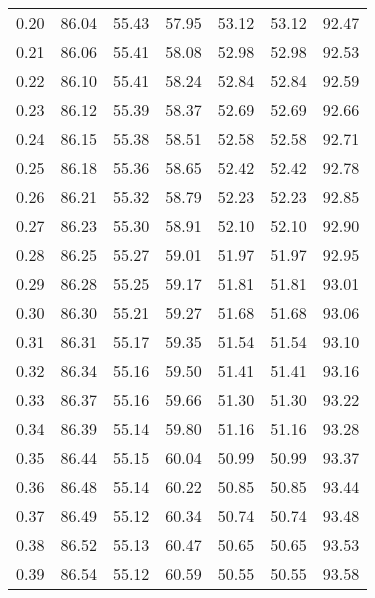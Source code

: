 \begin{tabular}{|c|c|c|c|c|c|c|}
      0.20 &     86.04 &     55.43 &      57.95 &   53.12 &      53.12 &         92.47 \\
      0.21 &     86.06 &     55.41 &      58.08 &   52.98 &      52.98 &         92.53 \\
      0.22 &     86.10 &     55.41 &      58.24 &   52.84 &      52.84 &         92.59 \\
      0.23 &     86.12 &     55.39 &      58.37 &   52.69 &      52.69 &         92.66 \\
      0.24 &     86.15 &     55.38 &      58.51 &   52.58 &      52.58 &         92.71 \\
      0.25 &     86.18 &     55.36 &      58.65 &   52.42 &      52.42 &         92.78 \\
      0.26 &     86.21 &     55.32 &      58.79 &   52.23 &      52.23 &         92.85 \\
      0.27 &     86.23 &     55.30 &      58.91 &   52.10 &      52.10 &         92.90 \\
      0.28 &     86.25 &     55.27 &      59.01 &   51.97 &      51.97 &         92.95 \\
      0.29 &     86.28 &     55.25 &      59.17 &   51.81 &      51.81 &         93.01 \\
      0.30 &     86.30 &     55.21 &      59.27 &   51.68 &      51.68 &         93.06 \\
      0.31 &     86.31 &     55.17 &      59.35 &   51.54 &      51.54 &         93.10 \\
      0.32 &     86.34 &     55.16 &      59.50 &   51.41 &      51.41 &         93.16 \\
      0.33 &     86.37 &     55.16 &      59.66 &   51.30 &      51.30 &         93.22 \\
      0.34 &     86.39 &     55.14 &      59.80 &   51.16 &      51.16 &         93.28 \\
      0.35 &     86.44 &     55.15 &      60.04 &   50.99 &      50.99 &         93.37 \\
      0.36 &     86.48 &     55.14 &      60.22 &   50.85 &      50.85 &         93.44 \\
      0.37 &     86.49 &     55.12 &      60.34 &   50.74 &      50.74 &         93.48 \\
      0.38 &     86.52 &     55.13 &      60.47 &   50.65 &      50.65 &         93.53 \\
      0.39 &     86.54 &     55.12 &      60.59 &   50.55 &      50.55 &         93.58 \\

\end{tabular}
